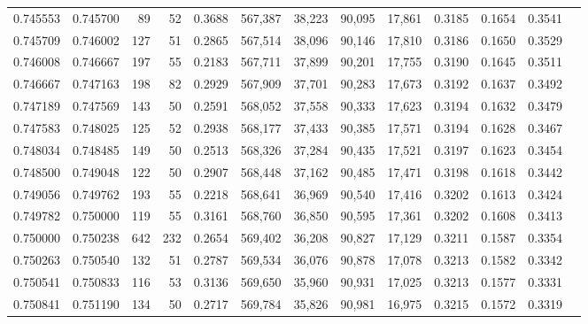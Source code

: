 \begin{tabular}{rrrrrrrrrrrrr}
0.745553 & 0.745700 &     89 &    52 &                                     0.3688 & 567,387 &  38,223 &  90,095 &  17,861 & 0.3185 & 0.1654 & 0.3541 \\
0.745709 & 0.746002 &    127 &    51 &                                     0.2865 & 567,514 &  38,096 &  90,146 &  17,810 & 0.3186 & 0.1650 & 0.3529 \\
0.746008 & 0.746667 &    197 &    55 &                                     0.2183 & 567,711 &  37,899 &  90,201 &  17,755 & 0.3190 & 0.1645 & 0.3511 \\
0.746667 & 0.747163 &    198 &    82 &                                     0.2929 & 567,909 &  37,701 &  90,283 &  17,673 & 0.3192 & 0.1637 & 0.3492 \\
0.747189 & 0.747569 &    143 &    50 &                                     0.2591 & 568,052 &  37,558 &  90,333 &  17,623 & 0.3194 & 0.1632 & 0.3479 \\
0.747583 & 0.748025 &    125 &    52 &                                     0.2938 & 568,177 &  37,433 &  90,385 &  17,571 & 0.3194 & 0.1628 & 0.3467 \\
0.748034 & 0.748485 &    149 &    50 &                                     0.2513 & 568,326 &  37,284 &  90,435 &  17,521 & 0.3197 & 0.1623 & 0.3454 \\
0.748500 & 0.749048 &    122 &    50 &                                     0.2907 & 568,448 &  37,162 &  90,485 &  17,471 & 0.3198 & 0.1618 & 0.3442 \\
0.749056 & 0.749762 &    193 &    55 &                                     0.2218 & 568,641 &  36,969 &  90,540 &  17,416 & 0.3202 & 0.1613 & 0.3424 \\
0.749782 & 0.750000 &    119 &    55 &                                     0.3161 & 568,760 &  36,850 &  90,595 &  17,361 & 0.3202 & 0.1608 & 0.3413 \\
0.750000 & 0.750238 &    642 &   232 &                                     0.2654 & 569,402 &  36,208 &  90,827 &  17,129 & 0.3211 & 0.1587 & 0.3354 \\
0.750263 & 0.750540 &    132 &    51 &                                     0.2787 & 569,534 &  36,076 &  90,878 &  17,078 & 0.3213 & 0.1582 & 0.3342 \\
0.750541 & 0.750833 &    116 &    53 &                                     0.3136 & 569,650 &  35,960 &  90,931 &  17,025 & 0.3213 & 0.1577 & 0.3331 \\
0.750841 & 0.751190 &    134 &    50 &                                     0.2717 & 569,784 &  35,826 &  90,981 &  16,975 & 0.3215 & 0.1572 & 0.3319 \\

\end{tabular}
